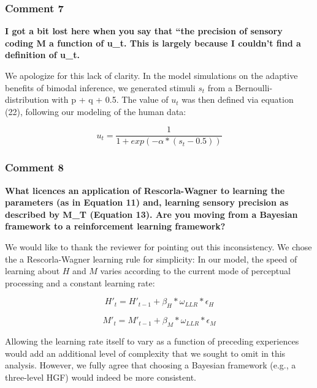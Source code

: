 \documentclass[
]{article}
\begin{document}
\hypertarget{comment-7}{%
\subsubsection{Comment 7}\label{comment-7}}

\textbf{I got a bit lost here when you say that ``the precision of
sensory coding M a function of u\_t. This is largely because I couldn't
find a definition of u\_t.}

We apologize for this lack of clarity. In the model simulations on the
adaptive benefits of bimodal inference, we generated stimuli \(s_t\)
from a Bernoulli-distribution with p + q + 0.5. The value of \(u_t\) was
then defined via equation (22), following our modeling of the human
data:

\begin{equation}
u_t = \frac{1}{1+exp(-\alpha*(s_t-0.5))}
\end{equation}

\hypertarget{comment-8}{%
\subsubsection{Comment 8}\label{comment-8}}

\textbf{What licences an application of Rescorla-Wagner to learning the
parameters (as in Equation 11) and, learning sensory precision as
described by M\_T (Equation 13). Are you moving from a Bayesian
framework to a reinforcement learning framework?}

We would like to thank the reviewer for pointing out this inconsistency.
We chose the a Rescorla-Wagner learning rule for simplicity: In our
model, the speed of learning about \(H\) and \(M\) varies according to
the current mode of perceptual processing and a constant learning rate:

\begin{equation}
H'_t = H'_{t-1} + \beta_H *\omega_{LLR} * \epsilon_H
\end{equation}

\begin{equation}
M'_t = M'_{t-1} + \beta_M *\omega_{LLR} * \epsilon_M
\end{equation}

Allowing the learning rate itself to vary as a function of preceding
experiences would add an additional level of complexity that we sought
to omit in this analysis. However, we fully agree that choosing a
Bayesian framework (e.g., a three-level HGF) would indeed be more
consistent.
\end{document}
